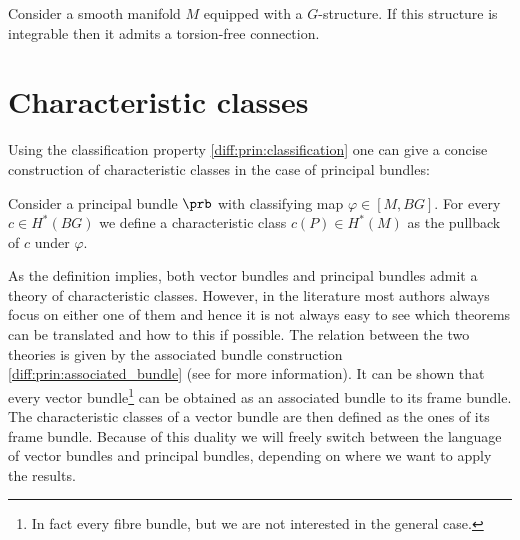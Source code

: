     \begin{property}\label{diff:prin:integrable_torsion_free}
        Consider a smooth manifold $M$ equipped with a $G$-structure. If this structure is integrable then it admits a torsion-free connection.
    \end{property}

\section{Characteristic classes}

    Using the classification property \ref{diff:prin:classification} one can give a concise construction of characteristic classes in the case of principal bundles:
    \begin{construct}
        Consider a principal bundle $\prb$ with classifying map $\varphi\in[M, BG]$. For every $c\in H^*(BG)$ we define a characteristic class $c(P)\in H^*(M)$ as the pullback of $c$ under $\varphi$.
    \end{construct}

    As the definition implies, both vector bundles and principal bundles admit a theory of characteristic classes. However, in the literature most authors always focus on either one of them and hence it is not always easy to see which theorems can be translated and how to this if possible. The relation between the two theories is given by the associated bundle construction \ref{diff:prin:associated_bundle} (see \cite{sorensen_characteristic} for more information). It can be shown that every vector bundle\footnote{In fact every fibre bundle, but we are not interested in the general case.} can be obtained as an associated bundle to its frame bundle. The characteristic classes of a vector bundle are then defined as the ones of its frame bundle. Because of this duality we will freely switch between the language of vector bundles and principal bundles, depending on where we want to apply the results.

